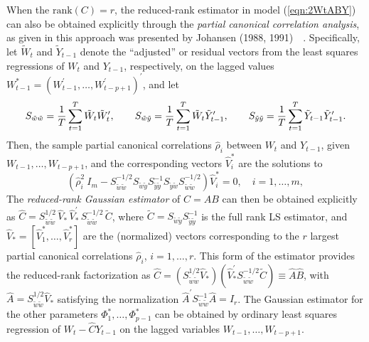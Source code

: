 When the  $\mbox{rank}(C)= r$, the reduced-rank estimator in model (\ref{eqn:2WtABY}) can also be obtained explicitly through the \textit{partial canonical correlation analysis}, as given in this approach was presented by Johansen (1988, 1991)~\cite{johansen1988statistical}~\cite{johansen1991estimation}. Specifically, let $\tilde{W}_t$ and $\tilde{Y}_{t-1}$ denote the ``adjusted'' or residual vectors from the least squares regressions of $W_t$ and $Y_{t-1}$, respectively, on the lagged values $W_{t-1}^*= (W_{t-1}^{\prime} ,\ldots, W_{t-p+1}^{\prime} )^{\prime} $, and let
	\[
	S_{ \tilde{w} \tilde{w} } = \frac{1}{T} \sum_{t=1}^T \tilde{W}_t
\tilde{W}_t^{\prime}, \qquad \hfill S_{ \tilde{w} \tilde{y} } = \frac{1}{T} \sum_{t=1}^T \tilde{W}_t
\tilde{Y}_{t-1}^{\prime} ,\qquad \hfill S_{ \tilde{y} \tilde{y} } = \frac{1}{T} \sum_{t=1}^T \tilde{Y}_{t-1}
\tilde{Y}_{t-1}^{\prime} . \hfill
	\]
Then, the sample partial canonical correlations $\hat{\rho}_i $ between $W_t$ and $Y_{t-1}$, given $W_{t-1} ,\ldots, W_{t-p+1} $, and the corresponding vectors $\hat{V}_i^*$ are the solutions to
	\begin{equation}\label{eqn:2rhohatM}
	(\hat{\rho}_i^2 \:I_m - S_{ \tilde{w} \tilde{w} }^{-1/2} S_{ \tilde{w} \tilde{y} } S_{ \tilde{y} \tilde{y} }^{-1} S_{ \tilde{y} \tilde{w} } S_{ \tilde{w} \tilde{w} }^{-1/2} )
\hat{V}_i^* = 0 , \quad i = 1 ,\ldots, m , 
	\end{equation}
The \textit{reduced-rank Gaussian estimator} of $C= A B$ can then be obtained explicitly as $\hat{C} = S_{\tilde{w} \tilde{w}}^{1/2}\, \hat{V}_* \,\hat{V}_*^{\prime}\, S_{\tilde{w} \tilde{w}}^{-1/2}\, \tilde{C}$, where $\tilde{C} = S_{ \tilde{w} \tilde{y}} S_{\tilde{y} \tilde{y}}^{-1} $ is the full rank LS estimator, and $\hat{V}_* = [ \hat{V}_1^* , \ldots, \hat{V}_r^* ]$ are the (normalized) vectors corresponding to the $r$ largest partial canonical correlations $\hat{\rho}_i $, $i = 1 ,\ldots, r$. This form of the estimator provides the reduced-rank factorization as $\hat{C} = (S_{\tilde{w} \tilde{w}}^{1/2} \hat{V}_* ) ( \hat{V}_*^{\prime} S_{\tilde{w} \tilde{w}}^{-1/2} \tilde{C} ) \equiv \hat{A} \hat{B}$, with $\hat{A} = S_{\tilde{w} \tilde{w}}^{1/2} \hat{V}_*$
satisfying the normalization $\hat{A}^{\prime} S_{\tilde{w} \tilde{w}}^{-1} \hat{A} = I_r$.  The Gaussian estimator for the other parameters $\Phi_1^* ,\ldots, \Phi_{p-1}^*$ can be obtained by ordinary least squares regression of $W_t - \hat{C} Y_{t-1} $ on the lagged variables $W_{t-1} ,\ldots, W_{t-p+1} $.


